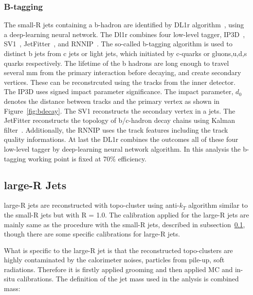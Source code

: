 \subsubsection{B-tagging}
The small-R jets containing a b-hadron are identified by DL1r algorithm~\cite{ATL-PHYS-PUB-2020-009}, using a deep-learning neural network.
The Dl1r combines four low-level tagger, IP3D~\cite{ATL-PHYS-PUB-2017-013}, SV1~\cite{ATL-PHYS-PUB-2017-011}, JetFitter~\cite{ATL-PHYS-PUB-2018-025}, and RNNIP~\cite{ATL-PHYS-PUB-2017-003}.
The so-called b-tagging algorithm is used to distinct b jets from c jets or light jets, which initiated by c-quarks or gluons,u,d,s quarks respectively.
The lifetime of the b hadrons are long enough to travel several mm from the primary interaction before decaying, and create secondary vertices. These can be reconstrcuted using the tracks from the inner detector.
The IP3D uses signed impact parameter significance. The impact parameter, $d_0$ denotes the distance between tracks and the primary vertex as shown in Figure~\ref{fig:bdecay}.
The SV1 reconstructs the secondary vertex in a jets. The JetFitter reconstructs the topology of b/c-hadron decay chains using Kalman filter~\cite{FRUHWIRTH1987444}.
Additionally, the RNNIP uses the track features including the track quality informations.
At last the DL1r combines the outcomes all of these four low-level tagger by deep-learning neural network algorithm.
In this analysis the b-tagging working point is fixed at 70\% efficiency.

\subsection{large-R Jets}
large-R jets are reconstructed with topo-cluster using anti-$k_T$ algorithm similar to the small-R jets but with R = 1.0. The calibration applied for the large-R jets are mainly same as the procedure with the small-R jets, described in subsection~\ref{}, though there are some specific calibrations for large-R jets.

What is specific to the large-R jet is that the reconstructed topo-clusters are highly contaminated by the calorimeter noises, particles from pile-up, soft radiations. Therefore it is firstly applied grooming and then applied MC and in-situ calibrations. The definition of the jet mass used in the anlysis is combined mass:


